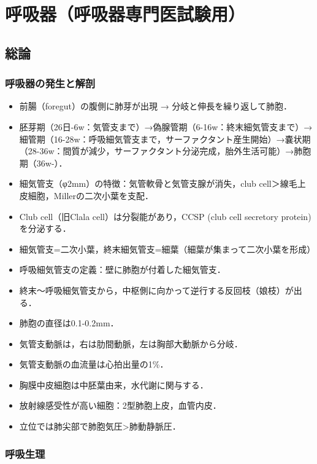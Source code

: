 

\section{呼吸器（呼吸器専門医試験用）}

\subsection{総論}

\subsubsection{呼吸器の発生と解剖}

\begin{itemize}
\item 前腸（foregut）の腹側に肺芽が出現 → 分岐と伸長を繰り返して肺胞．
\item 胚芽期（26日-6w：気管支まで）→偽腺管期（6-16w：終末細気管支まで）→細管期（16-28w：呼吸細気管支まで，サーファクタント産生開始）→嚢状期（28-36w：間質が減少，サーファクタント分泌完成，胎外生活可能）→肺胞期（36w-）．
\item 細気管支（φ2mm）の特徴：気管軟骨と気管支腺が消失，club cell＞線毛上皮細胞，Millerの二次小葉を支配．
\item Club cell（旧Clala cell）は分裂能があり，CCSP (club cell secretory protein)を分泌する．
\item 細気管支=二次小葉，終末細気管支=細葉（細葉が集まって二次小葉を形成）
\item 呼吸細気管支の定義：壁に肺胞が付着した細気管支．
\item 終末〜呼吸細気管支から，中枢側に向かって逆行する反回枝（娘枝）が出る．
\item 肺胞の直径は0.1-0.2mm．
\item 気管支動脈は，右は肋間動脈，左は胸部大動脈から分岐．
\item 気管支動脈の血流量は心拍出量の1\%．
\item 胸膜中皮細胞は中胚葉由来，水代謝に関与する．
\item 放射線感受性が高い細胞：2型肺胞上皮，血管内皮．
\item 立位では肺尖部で肺胞気圧>肺動静脈圧．
\end{itemize}


\subsubsection{呼吸生理}

